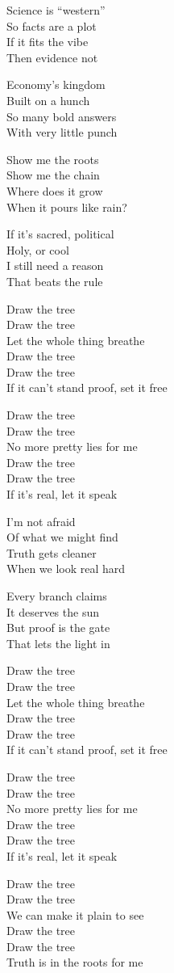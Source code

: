 \begin{lyrics}
Science is “western”\\
So facts are a plot\\
If it fits the vibe\\
Then evidence not

Economy’s kingdom\\
Built on a hunch\\
So many bold answers\\
With very little punch

Show me the roots\\
Show me the chain\\
Where does it grow\\
When it pours like rain?

If it’s sacred, political\\
Holy, or cool\\
I still need a reason\\
That beats the rule

Draw the tree\\
Draw the tree\\
Let the whole thing breathe\\
Draw the tree\\
Draw the tree\\
If it can’t stand proof, set it free

Draw the tree\\
Draw the tree\\
No more pretty lies for me\\
Draw the tree\\
Draw the tree\\
If it’s real, let it speak

I’m not afraid\\
Of what we might find\\
Truth gets cleaner\\
When we look real hard

Every branch claims\\
It deserves the sun\\
But proof is the gate\\
That lets the light in

Draw the tree\\
Draw the tree\\
Let the whole thing breathe\\
Draw the tree\\
Draw the tree\\
If it can’t stand proof, set it free

Draw the tree\\
Draw the tree\\
No more pretty lies for me\\
Draw the tree\\
Draw the tree\\
If it’s real, let it speak

Draw the tree\\
Draw the tree\\
We can make it plain to see\\
Draw the tree\\
Draw the tree\\
Truth is in the roots for me
\end{lyrics}

